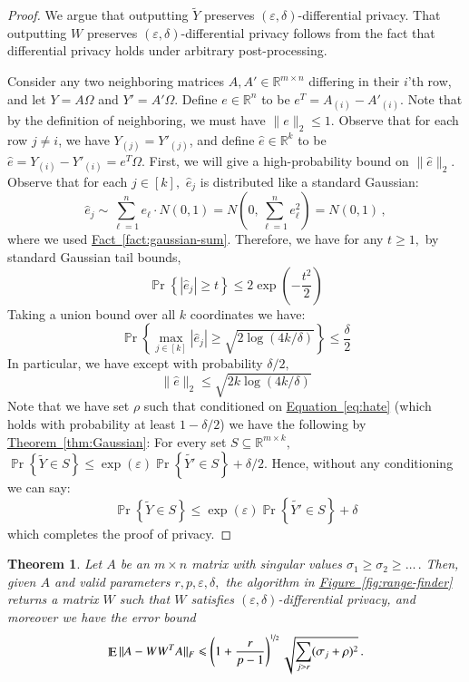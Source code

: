 \documentclass[letterpaper,11pt]{article}
\newtheorem{theorem}{Theorem}[section]
\theoremstyle{definition}
\newcommand{\equationlabel}[1]{\label{eq:#1}}
\newcommand{\equationref}[1]{\hyperref[eq:#1]{Equation~\ref{eq:#1}}}
\newcommand{\factref}[1]{\hyperref[fact:#1]{Fact~\ref{fact:#1}}}
\newcommand{\figureref}[1]{\hyperref[fig:#1]{Figure~\ref{fig:#1}}}
\newcommand{\theoremref}[1]{\hyperref[thm:#1]{Theorem~\ref{thm:#1}}}
\newcommand{\Esymb}{\mathbb{E}}
\newcommand{\Psymb}{\mathbb{P}}
\DeclareMathOperator*{\E}{\Esymb}
\DeclareMathOperator*{\ProbOp}{\Psymb r}
\renewcommand{\Pr}{\ProbOp}
\newcommand{\nfrac}{\nicefrac}
\newcommand{\mper}{\,.}
\newcommand{\mcom}{\,,}
\renewcommand{\hat}{\widehat}
\renewcommand{\leq}{\leqslant}
\renewcommand{\le}{\leqslant}
\renewcommand{\geq}{\geqslant}
\renewcommand{\ge}{\geqslant}
\newcommand{\Set}[1]{\left\{#1\right\}}
\renewcommand{\epsilon}{\varepsilon}
\begin{document}
\begin{proof}
We argue that outputting $\tilde{Y}$  preserves $(\epsilon,\delta)$-differential privacy. That outputting $W$ preserves $(\epsilon,\delta)$-differential privacy follows from the fact that differential privacy holds under arbitrary post-processing.

Consider any two neighboring matrices $A, A' \in \mathbb{R}^{m\times n}$
differing in their $i$'th row, and let $Y = A\Omega$ and $Y' = A'\Omega$.
Define $e \in \mathbb{R}^n$ to be $e^T = A_{(i)} - A'_{(i)}$. Note that by the
definition of neighboring, we must have $\|e\|_2 \leq 1$. Observe that for
each row $j \neq i$, we have $Y_{(j)} = Y'_{(j)}$, and define $\hat{e} \in
\mathbb{R}^k$ to be $\hat{e} = Y_{(i)} - Y'_{(i)} = e^T\Omega$. First, we will
give a high-probability bound on $\|\hat{e}\|_2$. Observe that for each $j \in
[k],$ $\hat{e}_j$ is distributed like a standard Gaussian:
\[
\hat{e}_j \sim \sum_{\ell = 1}^n e_\ell \cdot N(0,1) = N\left(0, \sum_{\ell =
1}^n e_\ell^2\right) = N(0,1)\mcom
\]
where we used \factref{gaussian-sum}.
Therefore, we have for any $t \geq 1,$
by standard Gaussian tail bounds,
\[
\Pr\Set{\left|\hat{e}_j\right| \geq t} \leq
2\exp\left(-\frac{t^2}{2}\right)
\]
Taking a union bound
over all $k$ coordinates we have:
\[
\Pr\Set{\max_{j\in[k]}\left|\hat{e}_j\right| \geq
\sqrt{2\log\left(4k/\delta\right)}} \leq
\frac{\delta}{2}
\]
In particular, we have except with probability $\delta/2,$
\begin{equation}\equationlabel{hate}
\|\hat{e}\|_2 \leq \sqrt{2k\log\left(4k/\delta\right)}
\end{equation}
Note that we have set $\rho$ such that
conditioned on \equationref{hate} (which holds with probability at
least $1-\delta/2$) we have the following by \theoremref{Gaussian}:
For every set $S\subseteq\mathbb{R}^{m\times k},$
$\Pr\Set{\tilde{Y} \in S} \leq \exp(\epsilon)\Pr\Set{\tilde{Y'} \in S} + \delta/2$.
Hence, without any conditioning we can say:
\[
\Pr\Set{\tilde{Y} \in S} \leq \exp(\epsilon)\Pr\Set{\tilde{Y'} \in S} + \delta
\]
which completes the proof of privacy.
\end{proof}

\begin{theorem}
Let $A$ be an $m\times n$ matrix with singular values
$\sigma_1\ge\sigma_2\ge\dots\mper$
Then, given $A$ and valid parameters $r,p,\epsilon,\delta,$
the algorithm in \figureref{range-finder} returns a matrix $W$ such that
$W$ satisfies $(\epsilon,\delta)$-differential privacy,
and moreover we have the error bound
\begin{equation}
\E\|A-WW^TA\|_F
\le \left(1+\frac r{p-1}\right)^{\nfrac12}\sqrt{\sum_{j>r}(\sigma_j+\rho)^2}
\mper
\end{equation}
\end{theorem}
\end{document}
